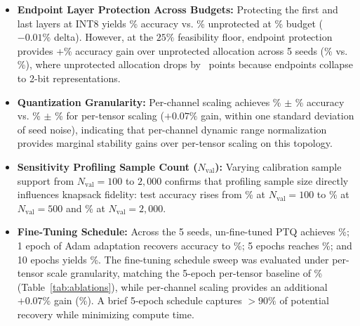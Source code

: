 \documentclass{ieeeaccess}
\begin{document}
\begin{itemize}
    \item \textbf{Endpoint Layer Protection Across Budgets:} Protecting the first and last layers at INT8 yields \MacroAblationProtFiftyMean\% accuracy vs. \MacroAblationUnprotFiftyMean\% unprotected at \MacroThresholdBudgetPct\% budget ($-0.01\%$ delta). However, at the $25\%$ feasibility floor, endpoint protection provides +\MacroAblationGainTwentyFive\% accuracy gain over unprotected allocation across 5 seeds (\MacroAblationProtTwentyFiveMean\% vs. \MacroAblationUnprotTwentyFiveMean\%), where unprotected allocation drops by \MacroAblationGainTwentyFive\ points because endpoints collapse to 2-bit representations.
    \item \textbf{Quantization Granularity:} Per-channel scaling achieves \MacroAblationPerChannelMean\% $\pm$ \MacroAblationPerChannelStd\% accuracy vs. \MacroAblationPerTensorMean\% $\pm$ \MacroAblationPerTensorStd\% for per-tensor scaling ($+0.07\%$ gain, within one standard deviation of seed noise), indicating that per-channel dynamic range normalization provides marginal stability gains over per-tensor scaling on this topology.
    \item \textbf{Sensitivity Profiling Sample Count ($N_{\text{val}}$):} Varying calibration sample support from $N_{\text{val}} = 100$ to $2{,}000$ confirms that profiling sample size directly influences knapsack fidelity: test accuracy rises from \MacroAblationNValHundred\% at $N_{\text{val}} = 100$ to \MacroAblationNValFiveHundred\% at $N_{\text{val}} = 500$ and \MacroAblationNValTwoThousand\% at $N_{\text{val}} = 2{,}000$.
    \item \textbf{Fine-Tuning Schedule:} Across the 5 seeds, un-fine-tuned PTQ achieves \MacroAblationFTZeroMean\%; 1 epoch of Adam adaptation recovers accuracy to \MacroAblationFTOneMean\%; 5 epochs reaches \MacroAblationFTFiveMean\%; and 10 epochs yields \MacroAblationFTTenMean\%. The fine-tuning schedule sweep was evaluated under per-tensor scale granularity, matching the 5-epoch per-tensor baseline of \MacroAblationPerTensorMean\% (Table~\ref{tab:ablations}), while per-channel scaling provides an additional $+0.07\%$ gain (\MacroAblationPerChannelMean\%). A brief 5-epoch schedule captures $>90\%$ of potential recovery while minimizing compute time.
\end{itemize}
\end{document}
